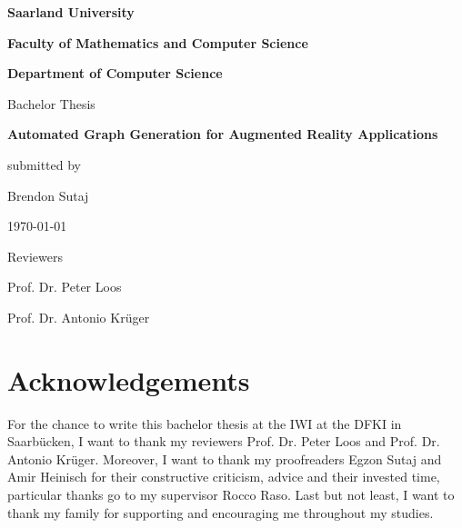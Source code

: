 \documentclass[12pt,a4paper,oneside,american,parskip=half]{article}
\begin{document}
\setmainfont{Times New Roman}
\onehalfspacing


\begin{titlepage}

	\centering
	\Large{\textbf{Saarland University}} \par
	\large{\textbf{Faculty of Mathematics and Computer Science}} \par
	\large{\textbf{Department of Computer Science}} \par
	\vspace{\baselineskip}
	\vspace{\baselineskip}
	\vspace{\baselineskip}
	\vspace{\baselineskip}
	\large{Bachelor Thesis} \par
	\vspace{\baselineskip}
	\vspace{\baselineskip}
	\Large{\textbf{Automated Graph Generation for Augmented Reality Applications}} \par
	\vspace{\baselineskip}
	\vspace{\baselineskip}
	\vspace{\baselineskip}
	\normalsize{submitted by} \par
	\normalsize{Brendon Sutaj} \par
	\normalsize{\today} \par
	\vspace{\baselineskip}
	\vspace{\baselineskip}
	\vspace{\baselineskip}
	\vspace{\baselineskip}
	\normalsize{Reviewers} \par
	\vspace{\baselineskip}
	\normalsize{Prof. Dr. Peter Loos} \par
	\normalsize{Prof. Dr. Antonio Krüger} \par
	\clearpage


\end{titlepage}

	\setcounter{page}{2}

	\section*{Acknowledgements}
For the chance to write this bachelor thesis at the \ac{IWI} at the \ac{DFKI} in Saarbücken, I want to thank my reviewers Prof. Dr. Peter Loos and Prof. Dr. Antonio Krüger. Moreover, I want to thank my proofreaders Egzon Sutaj and Amir Heinisch for their constructive criticism, advice and their invested time, particular thanks go to my supervisor Rocco Raso.
\newline
Last but not least, I want to thank my family for supporting and encouraging me throughout my studies.
	\clearpage
\end{document}
